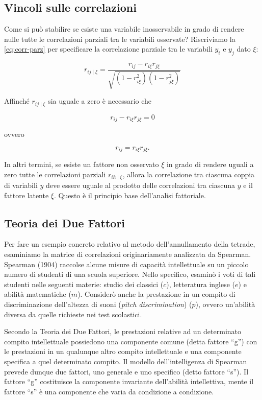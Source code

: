 \documentclass[
  11pt,
]{krantz}
\theoremstyle{definition}
\theoremstyle{definition}
\theoremstyle{definition}
\theoremstyle{definition}
\theoremstyle{remark}
\begin{document}
\hypertarget{vincoli-sulle-correlazioni}{%
\subsection{Vincoli sulle correlazioni}\label{vincoli-sulle-correlazioni}}

Come si può stabilire se esiste una variabile inosservabile in grado di rendere nulle tutte le correlazioni parziali tra le variabili osservate? Riscriviamo la \eqref{eq:corr-parz} per specificare la correlazione parziale tra le variabili \(y_i\) e \(y_j\) dato \(\xi\):

\[
  r_{ij \mid \xi} = \frac{r_{ij} - r_{i\xi}r_{j\xi}}
  {\sqrt{(1-r_{i\xi}^2)(1-r_{j\xi}^2)}}
\]

Affinché \(r_{ij \mid \xi}\) sia uguale a zero è necessario che

\[
r_{ij} - r_{i\xi}r_{j\xi}=0
\]

ovvero

\[
r_{ij} = r_{i\xi}r_{j\xi}.
\]

In altri termini, se esiste un fattore non osservato \(\xi\) in grado di rendere uguali a zero tutte le correlazioni parziali \(r_{ih \mid \xi}\), allora la correlazione tra ciascuna coppia di variabili \(y\) deve essere uguale al prodotto delle correlazioni tra ciascuna \(y\) e il fattore latente \(\xi\). Questo è il principio base dell'analisi fattoriale.

\hypertarget{teoria-dei-due-fattori}{%
\subsection{Teoria dei Due Fattori}\label{teoria-dei-due-fattori}}

Per fare un esempio concreto relativo al metodo dell'annullamento della tetrade, esaminiamo la matrice di correlazioni originariamente analizzata da Spearman. Spearman (1904) raccolse alcune misure di capacità intellettuale su un piccolo numero di studenti di una scuola superiore. Nello specifico, esaminò i voti di tali studenti nelle seguenti materie: studio dei classici (\(c\)), letteratura inglese (\(e\)) e abilità matematiche (\(m\)). Considerò anche la prestazione in un compito di discriminazione dell'altezza di suoni (\emph{pitch discrimination}) (\(p\)), ovvero un'abilità diversa da quelle richieste nei test scolastici.

Secondo la Teoria dei Due Fattori, le prestazioni relative ad un determinato compito intellettuale possiedono una componente comune (detta fattore ``g'') con le prestazioni in un qualunque altro compito intellettuale e una componente specifica a quel determinato compito. Il modello dell'intelligenza di Spearman prevede dunque due fattori, uno generale e uno specifico (detto fattore ``s''). Il fattore ``g'' costituisce la componente invariante dell'abilità intellettiva, mente il fattore ``s'' è una componente che varia da condizione a condizione.
\end{document}

